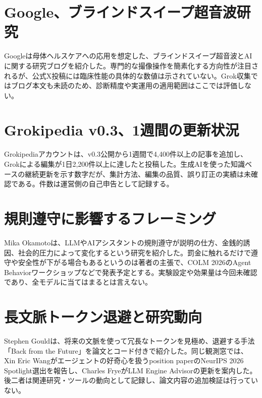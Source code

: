 \section{Google、ブラインドスイープ超音波研究}
Googleは母体ヘルスケアへの応用を想定した、ブラインドスイープ超音波とAIに関する研究ブログを紹介した。専門的な撮像操作を簡素化する方向性が注目されるが、公式X投稿には臨床性能の具体的な数値は示されていない。Grok収集ではブログ本文も未読のため、診断精度や実運用の適用範囲はここでは評価しない。

\section{Grokipedia v0.3、1週間の更新状況}
Grokipediaアカウントは、v0.3公開から1週間で4,400件以上の記事を追加し、Grokによる編集が1日2,200件以上に達したと投稿した。生成AIを使った知識ベースの継続更新を示す数字だが、集計方法、編集の品質、誤り訂正の実績は未確認である。件数は運営側の自己申告として記録する。

\section{規則遵守に影響するフレーミング}
Mika Okamotoは、LLMやAIアシスタントの規則遵守が説明の仕方、金銭的誘因、社会的圧力によって変化するという研究を紹介した。罰金に触れるだけで遵守や安全性が下がる場合もあるというのは著者の主張で、COLM 2026のAgent Behaviorワークショップなどで発表予定とする。実験設定や効果量は今回未確認であり、全モデルに当てはまるとは言えない。

\section{長文脈トークン退避と研究動向}
Stephen Gouldは、将来の文脈を使って冗長なトークンを見極め、退避する手法「Back from the Future」を論文とコード付きで紹介した。同じ観測窓では、Xin Eric Wangがエージェントの好奇心を扱うposition paperのNeurIPS 2026 Spotlight選出を報告し、Charles FryeがLLM Engine Advisorの更新を案内した。後二者は関連研究・ツールの動向として記録し、論文内容の追加検証は行っていない。

